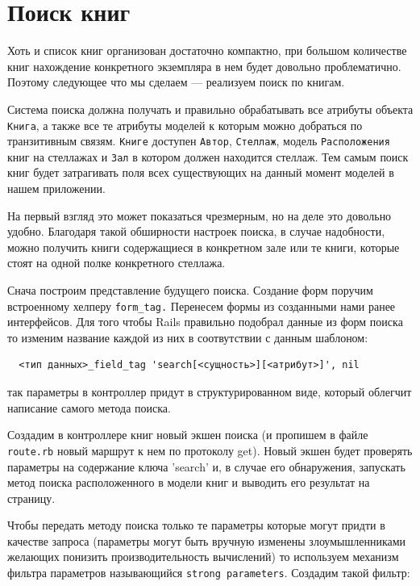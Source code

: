 \section{Поиск книг}

Хоть и список книг
организован достаточно компактно, при большом количестве книг нахождение
конкретного экземпляра в нем будет довольно проблематично.
Поэтому следующее что мы сделаем --- реализуем поиск по книгам.

Система поиска должна получать и правильно обрабатывать все атрибуты
объекта \verb|Книга|, а также все те атрибуты моделей к которым
можно добраться по транзитивным связям. \verb|Книге| доступен
\verb|Автор|, \verb|Стеллаж|, модель \verb|Расположения| книг на
стеллажах и \verb|Зал| в котором должен находится стеллаж.
Тем самым поиск книг будет затрагивать поля всех существующих на
данный момент моделей в нашем приложении.

На первый взгляд это может показаться чрезмерным, но на деле это довольно удобно.
Благодаря такой обширности настроек поиска, в случае надобности, можно
получить книги содержащиеся в конкретном зале или те книги, которые стоят
на одной полке конкретного стеллажа.

Снача построим представление будущего поиска. Создание форм
поручим встроенному хелперу \texttt{form\_tag.}
Перенесем формы из созданными нами ранее интерфейсов.
Для того чтобы Rails
правильно подобрал данные из форм поиска то изменим название
каждой из них в соотвутствии с данным шаблоном:
\begin{small}
\begin{verbatim}
  <тип данных>_field_tag 'search[<сущность>][<атрибут>]', nil
\end{verbatim}
\end{small}
\noindent
так параметры в контроллер придут в структурированном виде, который
облегчит написание самого метода поиска.

Создадим в контроллере книг новый экшен поиска (и пропишем в
файле \texttt{route.rb} новый маршрут к нем по протоколу get).
Новый экшен будет проверять параметры на содержание ключа 'search'
и, в случае его обнаружения, запускать метод поиска расположенного в
модели книг и выводить его результат на страницу.

Чтобы передать методу поиска только те параметры которые могут придти
в качестве запроса (параметры могут быть вручную изменены злоумышленниками
желающих понизить производительность вычислений) то используем
механизм фильтра параметров называющийся \texttt{strong parameters}.
Создадим такой фильтр:
\begin{small}

\end{small}

